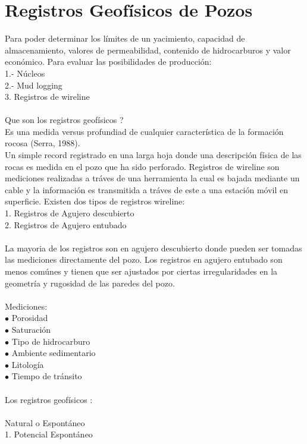 \documentclass[10pt,a4paper]{report}
\begin{document}

\section*{Registros Geofísicos de Pozos}
Para poder determinar los límites de un yacimiento, capacidad de almacenamiento, valores de permeabilidad, contenido de hidrocarburos y valor económico. Para evaluar las posibilidades de producción:
\\ 1.- Núcleos
\\ 2.- Mud logging
\\ 3. Registros de wireline
\\\\ Que son los registros geofísicos ?
\\ Es una medida versus profundiad de cualquier característica de la formación rocosa (Serra, 1988).
\\ Un simple record registrado en una larga hoja donde una descripción física de las rocas es medida en el pozo que ha sido perforado. Registros de wireline son mediciones realizadas a tráves de una herramienta la cual es bajada mediante un cable y la información es transmitida a tráves de este a una estación móvil en superficie. Existen dos tipos de registros wireline:
\\ 1. Registros de Agujero descubierto 
\\ 2. Registros de Agujero entubado
\\\\ La mayoria de los registros son en agujero descubierto donde pueden ser tomadas las mediciones directamente del pozo. Los registros en agujero entubado son menos comúnes y tienen que ser ajustados por ciertas irregularidades en la geometría y rugosidad de las paredes del pozo.
\\\\ Mediciones:
\\ $\bullet$ Porosidad
\\ $\bullet$ \; Saturación
\\ $\bullet$ \; Tipo de hidrocarburo
\\ $\bullet$ \; Ambiente sedimentario
\\ $\bullet$ \; Litología
\\ $\bullet$ \; Tiempo de tránsito
\\\\ Los registros geofísicos :
\\\\ Natural o Espontáneo
\\ 1. Potencial Espontáneo
\end{document}
